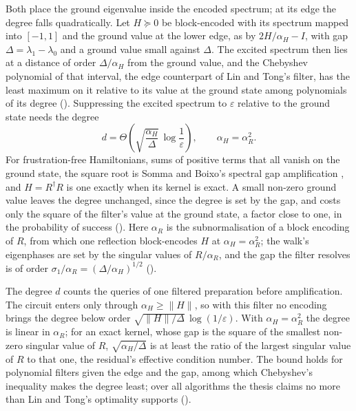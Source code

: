 Both place the ground eigenvalue inside the encoded spectrum; at its edge the degree falls quadratically. Let $H\succeq0$ be block-encoded with its spectrum mapped into $[-1,1]$ and the ground value at the lower edge, as by $2H/\alpha_H-I$, with gap $\Delta=\lambda_1-\lambda_0$ and a ground value small against $\Delta$. The excited spectrum then lies at a distance of order $\Delta/\alpha_H$ from the ground value, and the Chebyshev polynomial of that interval, the edge counterpart of Lin and Tong's filter, has the least maximum on it relative to its value at the ground state among polynomials of its degree \cite{borweinerdelyi1995} (). Suppressing the excited spectrum to $\varepsilon$ relative to the ground state needs the degree
\begin{equation}
    d = \Theta\!\left(\sqrt{\frac{\alpha_H}{\Delta}}\,\log\frac{1}{\varepsilon}\right),
    \qquad
    \alpha_H = \alpha_R^2 .
    \label{eq:degree}
\end{equation}
For frustration-free Hamiltonians, sums of positive terms that all vanish on the ground state, the square root is Somma and Boixo's spectral gap amplification \cite{somma2013gap}, and $H=R^\dagger R$ is one exactly when its kernel is exact. A small non-zero ground value leaves the degree unchanged, since the degree is set by the gap, and costs only the square of the filter's value at the ground state, a factor close to one, in the probability of success (). Here $\alpha_R$ is the subnormalisation of a block encoding of $R$, from which one reflection block-encodes $H$ at $\alpha_H=\alpha_R^2$; the walk's eigenphases are set by the singular values of $R/\alpha_R$, and the gap the filter resolves is of order $\sigma_1/\alpha_R=(\Delta/\alpha_H)^{1/2}$ ().

The degree $d$ counts the queries of one filtered preparation before amplification. The circuit enters only through $\alpha_H\ge\|H\|$, so with this filter no encoding brings the degree below order $\sqrt{\|H\|/\Delta}\,\log(1/\varepsilon)$. With $\alpha_H=\alpha_R^2$ the degree is linear in $\alpha_R$; for an exact kernel, whose gap is the square of the smallest non-zero singular value of $R$, $\sqrt{\alpha_H/\Delta}$ is at least the ratio of the largest singular value of $R$ to that one, the residual's effective condition number. The bound holds for polynomial filters given the edge and the gap, among which Chebyshev's inequality makes the degree least; over all algorithms the thesis claims no more than Lin and Tong's optimality supports ().

